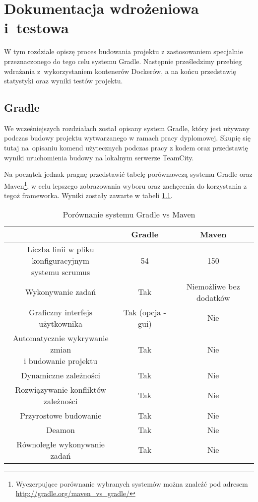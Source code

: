 \chapter{Dokumentacja wdrożeniowa i~testowa}
W tym rozdziale opiszę proces budowania projektu z zastosowaniem specjalnie przeznaczonego do tego celu systemu Gradle. Następnie prześledzimy przebieg wdrażania z~wykorzystaniem kontenerów Dockerów, a na końcu przedstawię statystyki oraz wyniki testów projektu.

\section{Gradle}
We wcześniejszych rozdziałach został opisany system Gradle, który jest używany podczas budowy projektu wytwarzanego w ramach pracy dyplomowej. Skupię się tutaj na~opisaniu komend użytecznych podczas pracy z kodem oraz przedstawię wyniki uruchomienia budowy na lokalnym serwerze TeamCity.

Na początek jednak pragnę przedstawić tabelę porównawczą systemu Gradle oraz Maven\footnote{Wyczerpujące porównanie wybranych systemów można znaleźć pod adresem \url{http://gradle.org/maven_vs_gradle/}}, w celu lepszego zobrazowania wyboru oraz zachęcenia do korzystania z tegoż frameworka. Wyniki zostały zawarte w tabeli \ref{tabela:gradle_vs_maven}.

\begin{table}[h!]
	\caption{Porównanie systemu Gradle vs Maven}
	\centering
	\begin{tabular}{|c|c|c|}
		\hline
		& Gradle & Maven \\
		\hline
		\specialcell{Liczba linii w pliku konfiguracyjnym\\ systemu scrumus} & 54 & 150 \\
		\hline		
		Wykonywanie zadań & Tak & Niemożliwe bez dodatków \\
		\hline		
		Graficzny interfejs użytkownika & Tak (opcja -gui) & Nie \\
		\hline		
		\specialcell{Automatycznie wykrywanie zmian\\ i budowanie projektu} & Tak & Nie \\
		\hline	
		Dynamiczne zależności & Tak & Nie \\
		\hline	
		Rozwiązywanie konfliktów zależności & Tak & Nie \\
		\hline	
		Przyrostowe budowanie & Tak & Nie \\
		\hline	
		Deamon & Tak & Nie \\
		\hline	
		Równoległe wykonywanie zadań & Tak & Nie \\
		\hline	
	\end{tabular}
	\label{tabela:gradle_vs_maven}
\end{table}

